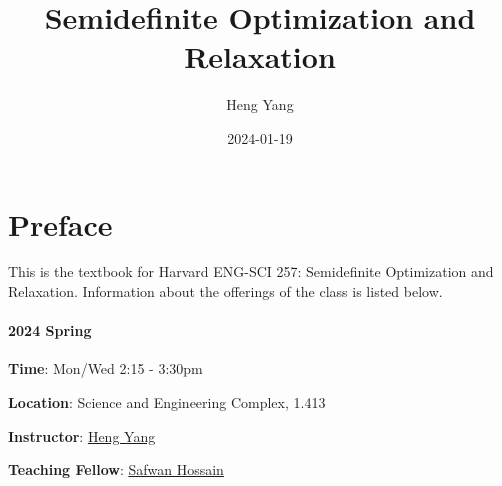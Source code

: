 \documentclass[
]{book}
\title{Semidefinite Optimization and Relaxation}
\author{Heng Yang}
\date{2024-01-19}
\begin{document}
\maketitle

{
\setcounter{tocdepth}{1}
\tableofcontents
}
\newcommand{\Real}[1]{\mathbb{R}^{#1}}
\newcommand{\sym}[1]{\mathbb{S}^{#1}}
\newcommand{\psd}[1]{\sym{#1}_{+}}
\newcommand{\pd}[1]{\sym{#1}_{++}}
\newcommand{\inprod}[2]{\langle #1, #2 \rangle}
\newcommand{\linprod}[2]{\left\langle #1, #2 \right\rangle}
\newcommand{\trace}{\mathrm{tr}}
\newcommand{\tran}{^\top}

\newcommand{\rank}{\mathrm{rank}}
\newcommand{\diag}{\mathrm{diag}}
\newcommand{\Diag}{\mathrm{Diag}}
\newcommand{\BlkDiag}{\mathrm{BlkDiag}}
\newcommand{\vectorize}{\mathrm{vec}}
\newcommand{\svec}{\mathrm{svec}}
\newcommand{\mat}{\mathrm{mat}}
\newcommand{\smat}{\mathrm{smat}}
\newcommand{\norm}[1]{\Vert #1 \Vert}
\newcommand{\lnorm}[1]{\left\Vert #1 \right\Vert}
\newcommand{\pnorm}[2]{\Vert #1 \Vert_{#2}}
\newcommand{\Fnorm}[1]{\Vert #1 \Vert_\mathrm{F}}
\newcommand{\conv}{\mathrm{conv}}
\newcommand{\cone}{\mathrm{cone}}
\newcommand{\interior}{\mathrm{int}}
\newcommand{\poly}[1]{\mathbb{R}[#1]}
\newcommand{\SOd}{\mathrm{SO}(d)}
\newcommand{\SOthree}{\mathrm{SO}(3)}
\newcommand{\usphere}{\mathcal{S}}
\newcommand{\bmath}[1]{\boldsymbol{#1}}
\newcommand{\lbrkt}{[\![}
\newcommand{\rbrkt}{]\!]}
\newcommand{\brkt}[1]{\lbrkt #1 \rbrkt}

\hypertarget{preface}{%
\chapter*{Preface}\label{preface}}

This is the textbook for Harvard ENG-SCI 257: Semidefinite Optimization and Relaxation. Information about the offerings of the class is listed below.

\hypertarget{spring}{%
\subsubsection*{2024 Spring}\label{spring}}

\textbf{Time}: Mon/Wed 2:15 - 3:30pm

\textbf{Location}: Science and Engineering Complex, 1.413

\textbf{Instructor}: \href{https://hankyang.seas.harvard.edu/}{Heng Yang}

\textbf{Teaching Fellow}: \href{https://safwanhossain.github.io/}{Safwan Hossain}
\end{document}
